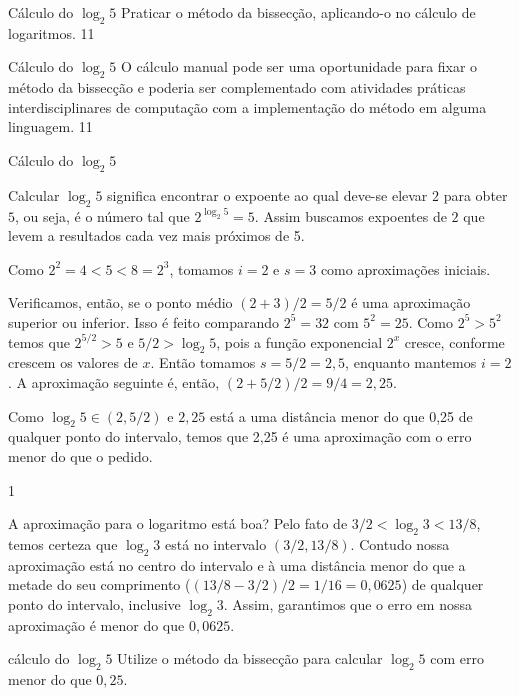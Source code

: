 \clearpage
\begin{objectives}{Cálculo do $\log_2 5$}
{
	Praticar o método da bissecção, aplicando-o no cálculo de logaritmos.
}{1}{1}
\end{objectives}
\begin{sugestions}{Cálculo do $\log_2 5$}
{
	O cálculo manual pode ser uma oportunidade para fixar o método da bissecção e poderia ser complementado com atividades práticas interdisciplinares de computação com a implementação do método em alguma linguagem.
}{1}{1}
\end{sugestions}
\begin{answer}{Cálculo do $\log_2 5$}
{
	Calcular $\log_2 5$ significa encontrar o expoente ao qual deve-se elevar $2$ para obter $5$, ou seja, é o número tal que $2^{\log_2 5} = 5$. Assim buscamos expoentes de $2$ que levem a resultados cada vez mais próximos de 5.

Como $2^2 = 4 <5<8 =2^3$, tomamos $i=2$ e $s=3$ como aproximações iniciais.

	Verificamos, então, se o ponto médio $(2+3)/2=5/2$ é uma aproximação superior ou inferior. Isso é feito comparando $2^5=32$ com $5^2=25$. Como $2^5 > 5^2$ temos que $2^{5/2} > 5$ e $5/2 > \log_2 5$, pois a função exponencial $2^x$ cresce, conforme crescem os valores de $x$. Então tomamos $s=5/2=2,5$, enquanto mantemos $i=2$. A aproximação seguinte é, então, $(2+5/2)/2 = 9/4 = 2,25$.

	Como $\log_2 5 \in (2, 5/2)$ e $2,25$ está a uma distância menor do que 0,25 de qualquer ponto do intervalo, temos que 2,25 é uma aproximação com o erro menor do que o pedido.
}{1}
\end{answer}

A aproximação para o logaritmo está boa? Pelo fato de $3/2 < \log_2 3 < 13/8$, temos certeza que $\log_2 3$ está no intervalo $(3/2,13/8)$. Contudo nossa aproximação está no centro do intervalo e à uma distância menor do que a metade do seu comprimento ($(13/8-3/2)/2= 1/16 = 0,0625$) de qualquer ponto do intervalo, inclusive $\log_2 3$. Assim, garantimos que o erro em nossa aproximação é menor do que $0{,}0625$.

\begin{task}{cálculo do $\log_2 5$}
Utilize o método da bissecção para calcular $\log_2 5$ com erro menor do que $0,25$. 
\end{task}


